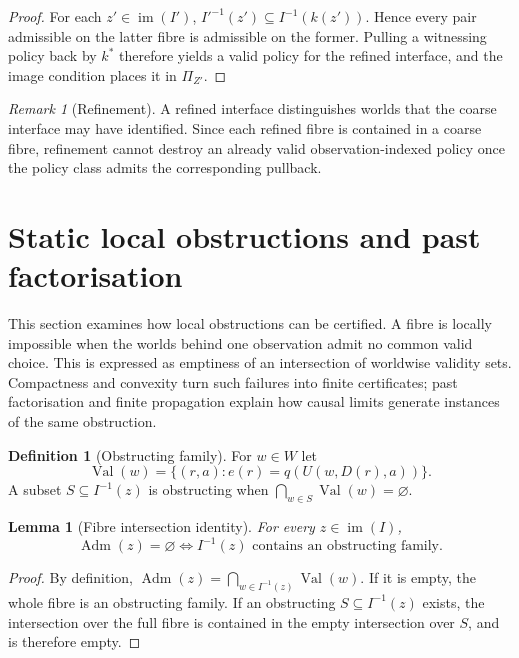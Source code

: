 \documentclass[11pt]{article}
\theoremstyle{plain}
\newtheorem{lemma}[theorem]{Lemma}
\theoremstyle{definition}
\newtheorem{definition}[theorem]{Definition}
\theoremstyle{remark}
\newtheorem{remark}[theorem]{Remark}
\newcommand{\im}{\operatorname{im}}
\newcommand{\Adm}{\operatorname{Adm}}
\begin{document}
\begin{proof}
For each $z'\in\im(I')$,
$I'^{-1}(z')\subseteq I^{-1}(k(z'))$. Hence every pair admissible on the latter
fibre is admissible on the former. Pulling a witnessing policy back by $k^*$
therefore yields a valid policy for the refined interface, and the image
condition places it in $\Pi_{Z'}$.
\end{proof}

\begin{remark}[Refinement]
A refined interface distinguishes worlds that the coarse interface may have
identified. Since each refined fibre is contained in a coarse fibre, refinement
cannot destroy an already valid observation-indexed policy once the policy class
admits the corresponding pullback.
\end{remark}

\section{Static local obstructions and past factorisation}\label{sec:static-local}

This section examines how local obstructions can be certified. A fibre is
locally impossible when the worlds behind one observation admit no common valid
choice. This is expressed as emptiness of an intersection of worldwise validity
sets. Compactness and convexity turn such failures into finite certificates;
past factorisation and finite propagation explain how causal limits generate
instances of the same obstruction.



\begin{definition}[Obstructing family]\label{def:obfamily}
For $w\in W$ let
\[
\operatorname{Val}(w)=\{(r,a):e(r)=q(U(w,D(r),a))\}.
\]
A subset $S\subseteq I^{-1}(z)$ is obstructing when
$\bigcap_{w\in S}\operatorname{Val}(w)=\varnothing$.
\end{definition}

\begin{lemma}[Fibre intersection identity]\label{lem:Wfam}
For every $z\in\im(I)$,
\[
\Adm(z)=\varnothing
\iff
I^{-1}(z)\text{ contains an obstructing family}.
\]
\end{lemma}

\begin{proof}
By definition,
$\Adm(z)=\bigcap_{w\in I^{-1}(z)}\operatorname{Val}(w)$. If it is empty, the
whole fibre is an obstructing family. If an obstructing
$S\subseteq I^{-1}(z)$ exists, the intersection over the full fibre is contained
in the empty intersection over $S$, and is therefore empty.
\end{proof}
\end{document}
